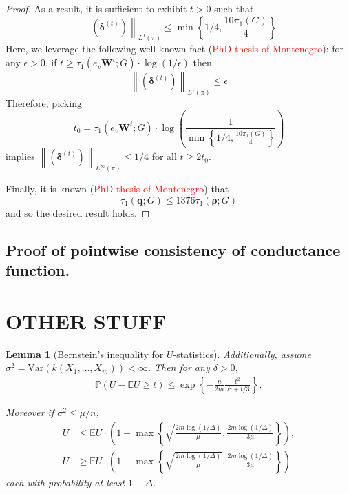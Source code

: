 \documentclass{article}
\newcommand{\norm}[1]{\left\lVert#1\right\rVert}
\newcommand{\1}{\mathbf{1}}
\newcommand{\var}{\mathrm{Var}}
\newcommand{\qbf}{\mathbf{q}}
\newcommand{\rhobf}{\bm{\rho}}
\newcommand{\deltabf}{\bm{\delta}}
\newcommand{\Wbf}{\mathbf{W}}
\theoremstyle{aldenthm}
\newtheorem{lemma}{Lemma}
\begin{document}
\begin{proof}
	As a result, it is sufficient to exhibit $t > 0$ such that
	\begin{equation*}
	\norm{(\deltabf^{(t)})}_{L^{1}(\pi)} \leq \min \left\{1/4,\frac{10 \pi_1(G)}{4}\right\}
	\end{equation*}
	Here, we leverage the following well-known fact (\textcolor{red}{PhD thesis of Montenegro}): for any $\epsilon > 0$, if $t \geq \tau_1(e_v \Wbf^t; G) \cdot \log(1/\epsilon)$ then
	\begin{equation*}
	\norm{(\deltabf^{(t)})}_{L^{1}(\pi)} \leq \epsilon
	\end{equation*}
	Therefore, picking 
	\begin{equation*}
	t_0 = \tau_1(e_v \Wbf^t; G) \cdot \log \left(\frac{1}{\min\left\{1/4,\frac{10 \pi_1(G)}{4}\right\}}\right)
	\end{equation*} implies $\norm{(\deltabf^{(t)})}_{L^{\infty}(\pi)} \leq 1/4$ for all $t \geq 2 t_0$. 
	
	Finally, it is known (\textcolor{red}{PhD thesis of Montenegro}) that
	\begin{equation*}
	\tau_{1}(\qbf; G) \leq 1376 \tau_{1}(\rhobf; G)
	\end{equation*}
	and so the desired result holds.
	
\end{proof}

\subsection{Proof of pointwise consistency of conductance function.}
\label{subsection: proof_of_pointwise consitency_of_conductance_function}









\section{OTHER STUFF}

	\begin{lemma}[Bernstein's inequality for $U$-statistics]
		\label{lem: bernstein}
		Additionally, assume $\sigma^2 = \var\left(k(X_1, \ldots, X_m) \right) < \infty$. Then for any $\delta > 0$, 
		\begin{align*}
		\mathbb{P}(U - \mathbb{E}U \geq t) \leq \exp\left\{-\frac{n}{2m}\frac{t^2}{\sigma^2 + t/3}\right\},
		\end{align*}
		
		Moreover if $\sigma^2 \leq \mu/n$, 
		\begin{align*}
		U & \leq \mathbb{E}U \cdot \left(1 + \max\left\{ \sqrt{\frac{2m\log(1/\Delta)}{\mu}}, \frac{2m \log(1/\Delta)}{3\mu} \right\}\right), \\
		U & \geq \mathbb{E}U \cdot \left(1 - \max\left\{ \sqrt{\frac{2m\log(1/\Delta)}{\mu}}, \frac{2m \log(1/\Delta)}{3\mu} \right\}\right)
		\end{align*}
		each with probability at least $1 - \Delta$.
	\end{lemma}
\end{document}
